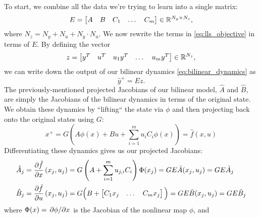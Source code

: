 \documentclass{article}
\begin{document}
  To start, we combine all the data we're trying to learn into a single matrix:
  \begin{equation}
      E = \begin{bmatrix} A & B & C_1 & \dots & C_m \end{bmatrix} \in \mathbb{R}^{N_y \times N_z},
  \end{equation}
  where $N_z = N_y + N_u + N_y \cdot N_u$.  We now rewrite the terms in
  \eqref{eq:lls_objective} in terms of $E$. By defining the vector 
  \begin{equation}
      z = \begin{bmatrix} y^T & u^T & u_1 y^T & \dots & u_m y^T \end{bmatrix} \in \mathbb{R}^{N_z},
  \end{equation}
  we can write down 
  the output of our bilinear dynamics \eqref{eq:bilinear_dynamics} as 
  \begin{equation} \label{eq:bilinear_dynamics_z}
      \hat{y}^+ = E z.
  \end{equation}
  The previously-mentioned projected Jacobians of our bilinear model, $\hat{A}$ and
  $\hat{B}$, are simply the Jacobians of the bilinear dynamics in terms of the original
  state. We obtain these dynamics by ``lifting`` the state via $\phi$ and then projecting
  back onto the original states using $G$:
  \begin{equation} \label{eq:projected_dynamics}
      x^+ = G \left( A \phi(x) + B u + \sum_{i=1}^m u_i C_i \phi(x) \right)  = \hat{f}(x,u) 
  \end{equation}
  Differentiating these dynamics gives us our projected Jacobians:
  \begin{subequations} \label{eq:projected_jacobians}
  \begin{align}
      \hat{A}_j &= \pdv{\hat{f}}{x}\left(x_j,u_j\right) 
                = G \left(A + \sum_{i=1}^m u_{j,i} C_i \right) \Phi(x_j)
                = G E \bar{A}(x_j,u_j) = G E \bar{A}_j \\
      \hat{B}_j &= \pdv{\hat{f}}{u}\left(x_j,u_j\right) 
                = G \Big(B + \begin{bmatrix} C_1 x_j & \dots & C_m x_j \end{bmatrix} \Big)
                = G E \bar{B}(x_j,u_j) = G E \bar{B}_j
  \end{align}
  \end{subequations}
  where $\Phi(x) = \pdv*{\phi}{x}$ is the Jacobian of the nonlinear map $\phi$, and
\end{document}
